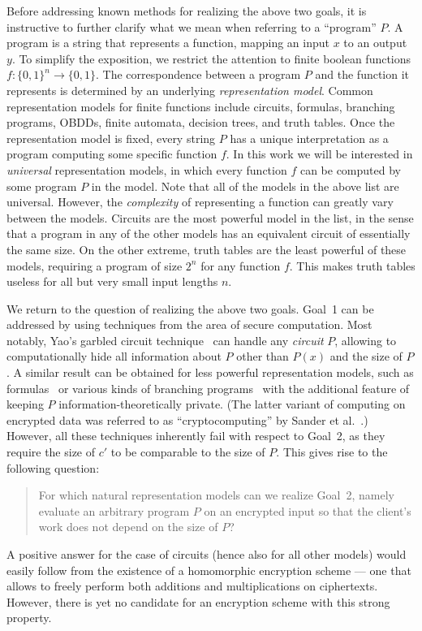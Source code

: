 \documentclass{article}
\begin{document}
Before addressing known methods for realizing the above two
goals, it is instructive to further clarify what we mean when
referring to a ``program'' $P$. A program is a string that
represents a function, mapping an input $x$ to an output $y$. To
simplify the exposition, we restrict the attention to finite
boolean functions $f:\{0,1\}^n\to\{0,1\}$. The correspondence
between a program $P$ and the function it represents is
determined by an underlying {\em representation model}. Common
representation models for finite functions include circuits,
formulas, branching programs, OBDDs, finite automata, decision
trees, and truth tables. Once the representation model is fixed,
every string $P$ has a unique interpretation as a program
computing some specific function $f$. In this work we will be
interested in {\em universal} representation models, in which
every function $f$ can be computed by some program $P$ in the
model. Note that all of the models in the above list are
universal.  However, the {\em complexity} of representing a
function can greatly vary between the models.
Circuits are the most powerful model in the list, in the sense
that a program in any of the other models has an equivalent
circuit of essentially the same size. On the other extreme,
truth tables are the least powerful of these models, requiring
a program of size $2^n$ for any function $f$. This makes truth
tables useless for all but very small input lengths $n$.

We return to the question of realizing the above two goals. Goal~1
can be addressed by using techniques from the area of secure
computation.  Most notably, Yao's garbled circuit
technique~\cite{yao86,cckm00,LP04} can handle any {\em circuit} $P$,
allowing to computationally hide all information about $P$ other
than $P(x)$ and the size of $P$. A similar result can be obtained
for less powerful representation models, such as
formulas~\cite{syy99,K,Kol} or various kinds of branching
programs~\cite{beaver00,FKN94,ik00,Rap} with the additional feature of
keeping $P$ information-theoretically private. (The latter variant
of computing on encrypted data was referred to as
``cryptocomputing'' by Sander et al.~\cite{syy99}.) However, all
these techniques inherently fail with respect to Goal~2, as they
require the size of $c'$ to be comparable to the size of $P$. This
gives rise to the following question:
\begin{quote}
For which natural representation models can we realize Goal~2,
namely evaluate an arbitrary program $P$ on an encrypted input
so that the client's work does not depend on the size of $P$?
\end{quote}
A positive answer for the case of circuits (hence also for all
other models) would easily follow from the existence of a 
homomorphic encryption scheme --- one that allows to freely perform
both additions and multiplications on ciphertexts. However, there
is yet no candidate for an encryption scheme with this strong
property.
\end{document}
